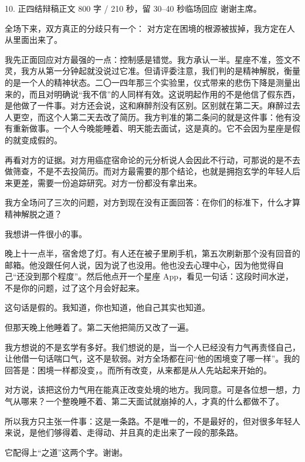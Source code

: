 \documentclass[script,pro]{debate}
\begin{document}
\begin{speech}{10. 正四结辩稿}{正文 800 字 / 210 秒，留 30–40 秒临场回应}
谢谢主席。

全场下来，双方真正的分歧只有一个： 对方定在困境的根源被拔掉，我方定在人从里面出来了。

我先正面回应对方最强的一点：控制感是错觉。我方承认一半。星座不准，签文不灵，我方从第一分钟起就没说过它准。但请评委注意，我们判的是精神解脱，衡量的是一个人的精神状态。二〇一四年那三个实验里，仪式带来的悲伤下降是测量出来的，而且对明确说“我不信”的人同样有效。这说明起作用的不是他信了假东西，是他做了一件事。对方还会说，这和麻醉剂没有区别。区别就在第二天。麻醉过去人更空，而这个人第二天去改了简历。我方判准的第二条问的就是这件事：他有没有重新做事。一个人今晚能睡着、明天能去面试，这是真的。它不会因为星座是假的就变成假的。

再看对方的证据。对方用癌症宿命论的元分析说人会因此不行动，可那说的是不去做筛查，不是不去投简历。而对方最需要的那个结论，也就是拥抱玄学的年轻人后来更差，需要一份追踪研究。对方一份都没有拿出来。

我方全场问了三次的问题，对方到现在没有正面回答：在你们的标准下，什么才算精神解脱之道？

我想讲一件很小的事。

晚上十一点半，宿舍熄了灯。有人还在被子里刷手机，第五次刷新那个没有回音的邮箱。他没跟任何人说，因为说了也没用。他也没去心理中心，因为他觉得自己“还没到那个程度”。然后他点开一个星座 App，看见一句话：这段时间水逆，不是你的问题，过了这个月会好起来。

这句话是假的。我知道，你也知道，他自己其实也知道。

但那天晚上他睡着了。第二天他把简历又改了一遍。

我方想说的不是玄学有多好。我们想说的是，当一个人已经没有力气再责怪自己，让他借一句话喘口气，这不是软弱。对方全场都在问“他的困境变了哪一样”。我的回答是：困境一样都没变，。而所有改变，从来都是从人先站起来开始的。

对方说，该把这份力气用在能真正改变处境的地方。我同意。可是各位想一想，力气从哪来？一个整晚睡不着、第二天面试就崩掉的人，才真的什么都做不了。

所以我方只主张一件事：这是一条路。不是唯一的，不是最好的，但对很多年轻人来说，是他们够得着、走得动、并且真的走出来了一段的那条路。

它配得上“之道”这两个字。谢谢。

\begin{contingency}
\end{contingency}
\end{speech}
\end{document}
